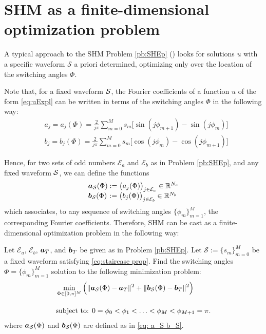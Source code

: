 \documentclass[9pt,shortpaper,twoside,web]{ieeecolor}
\begin{document}
\section{SHM as a finite-dimensional optimization problem}\label{sec:SHE_finite-dim_pbm}

A typical approach to the SHM Problem \ref{pb:SHEp} (\cite{Sun1996,Konstantinou2010,Yang2015}) looks for solutions $u$ with a specific waveform $\mathcal{S}$ a priori determined, optimizing only over the location of the switching angles $\Phi$. 

Note that, for a fixed waveform $\mathcal{S}$, the Fourier coefficients of a function $u$ of the form \eqref{eq:uExpl} can be written in terms of the switching angles $\Phi$ in the following way:
\begin{align*}
	& a_j = a_j(\Phi) =  \frac{2}{j\pi} \sum_{m=0}^{M} s_m \Big[\sin(j\phi_{m+1}) -\sin(j\phi_{m})\Big]
	\\[5pt]
	& b_j = b_j(\Phi) = \frac{2}{j\pi} \sum_{m=0}^{M} s_m \Big[\cos(j\phi_{m}) -\cos(j\phi_{m+1})\Big]
\end{align*}

Hence, for two sets of odd numbers $\mathcal{E}_a$ and $\mathcal{E}_b$ as in Problem \ref{pb:SHEp}, and any fixed waveform $\mathcal{S}$, we can define the functions
\begin{equation}\label{eq: a_S b_S}
	\begin{array}{l}
		\bm{a}_{\mathcal{S}} (\Phi) := \big(a_j (\Phi)\big)_{j\in \mathcal{E}_a} \in \mathbb{R}^{N_a}
		\\
		\bm{b}_{\mathcal{S}} (\Phi) \hspace{0.1em}:= \big(b_j (\Phi)\big)_{j\in \mathcal{E}_b} \in \mathbb{R}^{N_b}
	\end{array}
\end{equation}
which associates, to any sequence of switching angles $\{\phi_m\}_{m=1}^{M}$, the corresponding Fourier coefficients.
Therefore,  SHM can be cast as a finite-dimensional optimization problem in the following way:

\begin{problem}\label{pb:SHE opt}
	Let $\mathcal{E}_a$, $\mathcal{E}_b$, $\bm{a}_T$, and $\bm{b}_T$ be given as in Problem \ref{pb:SHEp}. Let $\mathcal S := \{ s_m\}_{m=0}^M$ be a fixed waveform satisfying \eqref{eq:staircase prop}.  Find the switching angles $\Phi = \{\phi_m\}_{m=1}^{M}$ solution to the following minimization problem:
	\begin{align}
		&\min_{\Phi \in [0,\pi]^{M}} \Big( \|\bm{a}_{\mathcal{S}} (\Phi) - \bm{a}_T\|^2 + \| \bm{b}_{\mathcal{S}} (\Phi) - \bm{b}_T\|^2\Big)\notag 
		\\[10pt]
		&\mbox{subject to: } 0 = \phi_0 <\phi_1 < \ldots < \phi_{M} < \phi_{M+1} = \pi. \notag 
	\end{align}
	where $\bm{a}_{\mathcal{S}} (\Phi)$ and $\bm{b}_{\mathcal{S}} (\Phi)$ are defined as in \eqref{eq: a_S b_S}.
\end{problem}
\end{document}
